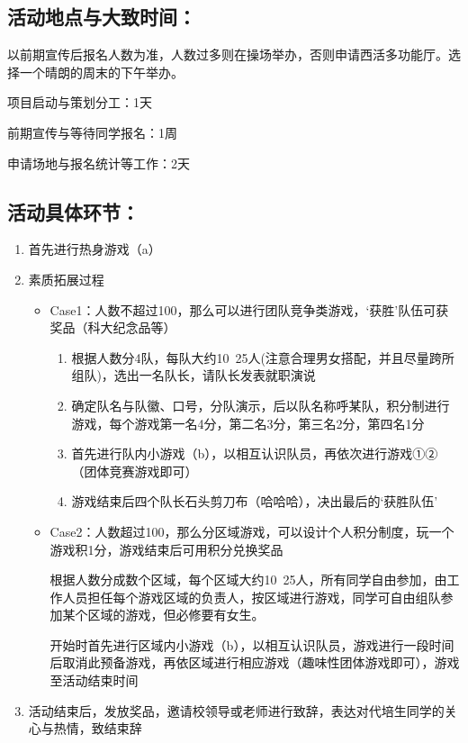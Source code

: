 \documentclass{article}
\begin{document}
\begin{CJK}{UTF8}{gbsn}
\subsection{活动地点与大致时间：}
以前期宣传后报名人数为准，人数过多则在操场举办，否则申请西活多功能厅。选择一个晴朗的周末的下午举办。

项目启动与策划分工：1天

前期宣传与等待同学报名：1周

申请场地与报名统计等工作：2天

\subsection{活动具体环节：}
\begin{enumerate}
	\item 首先进行热身游戏（a）
	
	\item 素质拓展过程
	\begin{itemize}
			\item Case1：人数不超过100，那么可以进行团队竞争类游戏，‘获胜’队伍可获奖品（科大纪念品等）
			\begin{enumerate}
					\item	根据人数分4队，每队大约10~25人(注意合理男女搭配，并且尽量跨所组队)，选出一名队长，请队长发表就职演说
					\item	确定队名与队徽、口号，分队演示，后以队名称呼某队，积分制进行游戏，每个游戏第一名4分，第二名3分，第三名2分，第四名1分
					\item	首先进行队内小游戏（b），以相互认识队员，再依次进行游戏①②（团体竞赛游戏即可）
					\item 游戏结束后四个队长石头剪刀布（哈哈哈），决出最后的‘获胜队伍’		
			\end{enumerate}

			\item Case2：人数超过100，那么分区域游戏，可以设计个人积分制度，玩一个游戏积1分，游戏结束后可用积分兑换奖品
			
			根据人数分成数个区域，每个区域大约10~25人，所有同学自由参加，由工作人员担任每个游戏区域的负责人，按区域进行游戏，同学可自由组队参加某个区域的游戏，但必修要有女生。
			
			开始时首先进行区域内小游戏（b），以相互认识队员，游戏进行一段时间后取消此预备游戏，再依区域进行相应游戏（趣味性团体游戏即可），游戏至活动结束时间
	\end{itemize}

	
	\item  活动结束后，发放奖品，邀请校领导或老师进行致辞，表达对代培生同学的关心与热情，致结束辞
\end{enumerate}



\end{CJK}
\end{document}
